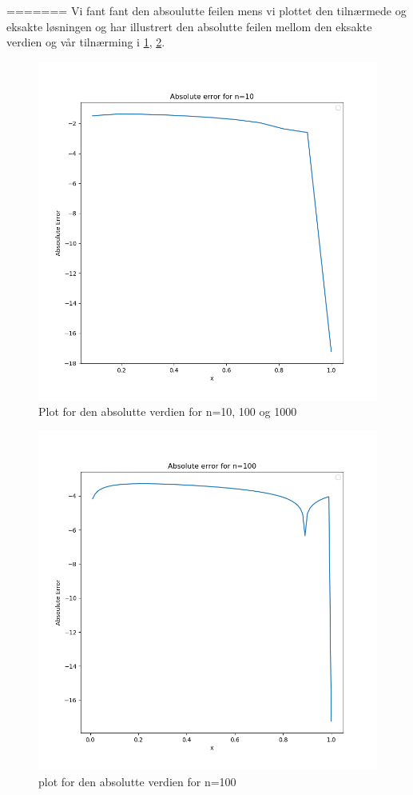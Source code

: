 \documentclass[english,notitlepage]{revtex4-1}  %
\begin{document}
=======
Vi fant fant den absoulutte feilen mens vi plottet den tilnærmede og eksakte løsningen og har illustrert den absolutte feilen mellom den eksakte verdien og vår tilnærming i \ref{abserrn10}, \ref{abserrn100}.
\begin{figure}
	\centering
	\label{abserrn10}
	\includegraphics[scale=0.5]{abserrn10.png}
	\caption{Plot for den absolutte verdien for n=10, 100 og 1000}
\end{figure}
\begin{figure}
	\centering
	\label{abserrn100}
	\includegraphics[scale=0.5]{abserrn100.png}
	\caption{plot for den absolutte verdien for n=100}
\end{figure}
\end{document}
